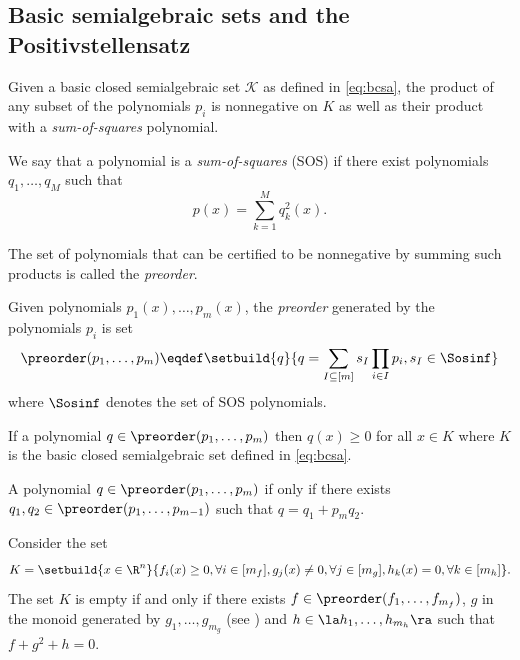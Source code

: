 \documentclass[11pt,twoside,a4paper,openright]{uclouvain-thesis}
\begin{document}
\subsection{Basic semialgebraic sets and the Positivstellensatz}

Given a basic closed semialgebraic set $\mathcal{K}$ as defined in \eqref{eq:bcsa},
the product of any subset of the polynomials $p_i$ is nonnegative on $K$
as well as their product with a \emph{sum-of-squares} polynomial.
\begin{mydef}
  \label{def:sos}
  We say that a polynomial is a \emph{sum-of-squares} (SOS) if there exist
  polynomials $q_1, \ldots, q_M$ such that
  \[ p(x) = \sum_{k=1}^Mq_k^2(x). \]
\end{mydef}

The set of polynomials that can be certified to be nonnegative by summing
such products is called the \emph{preorder}.

\begin{mydef}[Preorder]
  Given polynomials $p_1(x), \ldots, p_m(x)$, the \emph{preorder} generated by
  the polynomials $p_i$ is set
  \begin{equation}
    \label{eq:preorder}
    \preorder(p_1, \ldots, p_m) \eqdef
    \setbuild{q}{q = \sum_{I \subseteq [m]} s_I \prod_{i \in I} p_i, s_I \in \Sosinf}
  \end{equation}
  where $\Sosinf$ denotes the set of SOS polynomials.
\end{mydef}

\begin{myprop}
  \label{prop:preorder}
  If a polynomial $q \in \preorder(p_1, \ldots, p_m)$
  then $q(x) \ge 0$ for all $x \in K$ where $K$ is the basic closed semialgebraic
  set defined in \eqref{eq:bcsa}.
\end{myprop}

\begin{myprop}
  \label{prop:preordersplit}
  A polynomial $q \in \preorder(p_1, \ldots, p_m)$ if only if there exists
  $q_1, q_2 \in \preorder(p_1, \ldots, p_{m-1})$ such that
  $q = q_1 + p_mq_2$.
\end{myprop}

\begin{mytheo}
  \label{theo:positiv}
  Consider the set
  \[ K = \setbuild{x \in \R^n}{f_i(x) \ge 0, \forall i \in [m_f], g_j(x) \neq 0, \forall j \in [m_g], h_k(x) = 0, \forall k \in [m_h]}. \]
  The set $K$ is empty if and only if there exists $f \in \preorder(f_1, \ldots, f_{m_f})$,
  $g$ in the monoid generated by $g_1, \ldots, g_{m_g}$ (see ) and
  $h \in \la h_1, \ldots, h_{m_h} \ra$ such that $f + g^2 + h = 0$.
\end{mytheo}
\end{document}
